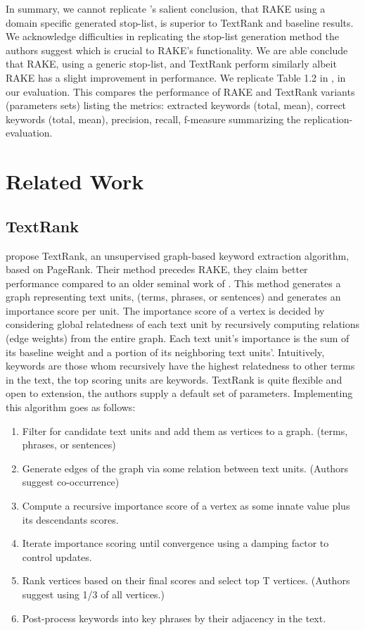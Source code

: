 \documentclass[11pt,a4paper]{article}
\begin{document}
In summary, we cannot replicate \citet{1}'s salient conclusion, that RAKE using a domain specific generated stop-list, is superior to TextRank and baseline results. We acknowledge difficulties in replicating the stop-list generation method the authors suggest which is crucial to RAKE's functionality. We are able conclude that RAKE, using a generic stop-list, and TextRank perform similarly albeit RAKE has a slight improvement in performance. We replicate Table 1.2 in \citet{1}, in our evaluation. This compares the performance of RAKE and TextRank variants (parameters sets) listing the metrics: extracted keywords (total, mean), correct keywords (total, mean), precision, recall, f-measure summarizing the replication-evaluation. 

\section{Related Work}

\subsection{TextRank}

\citet{4} propose TextRank, an unsupervised graph-based keyword extraction algorithm, based on PageRank. Their method precedes RAKE, they claim better performance compared to an older seminal work of \citet{hulth-2003-improved}. This method generates a graph representing text units, (terms, phrases, or sentences) and generates an importance score per unit. The importance score of a vertex is decided by considering global relatedness of each text unit by recursively computing relations (edge weights) from the entire graph. Each text unit's importance is the sum of its baseline weight and a portion of its neighboring text units'. Intuitively, keywords are those whom recursively have the highest relatedness to other terms in the text, the top scoring units are keywords. TextRank is quite flexible and open to extension, the authors supply a default set of parameters. Implementing this algorithm goes as follows:

\begin{enumerate}
\small \itemsep0em 

\item Filter for candidate text units and add them as vertices to a graph. (terms, phrases, or sentences)
\item Generate edges of the graph via some relation between text units. (Authors suggest co-occurrence)
\item Compute a recursive importance score of a vertex as some innate value plus its descendants scores.    
\item Iterate importance scoring until convergence using a damping factor to control updates.
\item Rank vertices based on their final scores and select top T vertices. (Authors suggest using 1/3 of all vertices.)
\item Post-process keywords into key phrases by their adjacency in the text.

\normalsize
\end{enumerate}   
\end{document}

